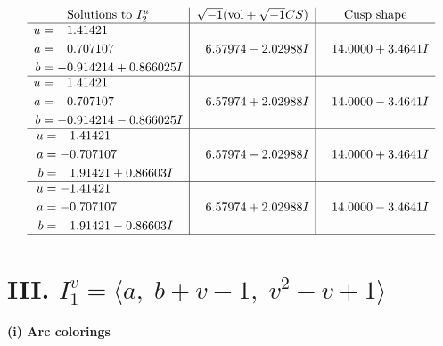 \documentclass[1p]{elsarticle_modified}
\theoremstyle{definition}
\newcommand{\I}{\sqrt{-1}}
\begin{document}
$$\begin{array}{c|c|c}  
\text{Solutions to }I^u_{2}& \I (\text{vol} + \sqrt{-1}CS) & \text{Cusp shape}\\
 \hline 
\begin{aligned}
u &= \phantom{-}1.41421\phantom{ +0.000000I} \\
a &= \phantom{-}0.707107\phantom{ +0.000000I} \\
b &= -0.914214 + 0.866025 I\end{aligned}
 & \phantom{-}6.57974 - 2.02988 I & \phantom{-}14.0000 + 3.4641 I \\ \hline\begin{aligned}
u &= \phantom{-}1.41421\phantom{ +0.000000I} \\
a &= \phantom{-}0.707107\phantom{ +0.000000I} \\
b &= -0.914214 - 0.866025 I\end{aligned}
 & \phantom{-}6.57974 + 2.02988 I & \phantom{-}14.0000 - 3.4641 I \\ \hline\begin{aligned}
u &= -1.41421\phantom{ +0.000000I} \\
a &= -0.707107\phantom{ +0.000000I} \\
b &= \phantom{-}1.91421 + 0.86603 I\end{aligned}
 & \phantom{-}6.57974 - 2.02988 I & \phantom{-}14.0000 + 3.4641 I \\ \hline\begin{aligned}
u &= -1.41421\phantom{ +0.000000I} \\
a &= -0.707107\phantom{ +0.000000I} \\
b &= \phantom{-}1.91421 - 0.86603 I\end{aligned}
 & \phantom{-}6.57974 + 2.02988 I & \phantom{-}14.0000 - 3.4641 I\\
 \hline 
 \end{array}$$\newpage\newpage\renewcommand{\arraystretch}{1}
\centering \section*{III. $I^v_{1}= \langle a,\;b+v-1,\;v^2- v+1 \rangle$}
\flushleft \textbf{(i) Arc colorings}\\
\end{document}
